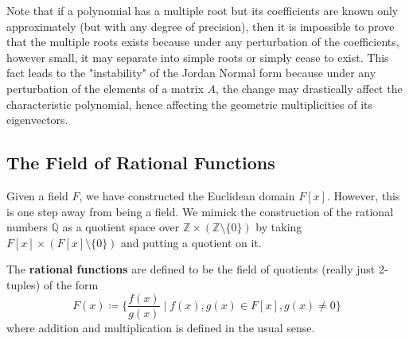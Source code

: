   Note that if a polynomial has a multiple root but its coefficients are known only approximately (but with any degree of precision), then it is impossible to prove that the multiple roots exists because under any perturbation of the coefficients, however small, it may separate into simple roots or simply cease to exist. This fact leads to the "instability" of the Jordan Normal form because under any perturbation of the elements of a matrix $A$, the change may drastically affect the characteristic polynomial, hence affecting the geometric multiplicities of its eigenvectors. 

\subsection{The Field of Rational Functions}

  Given a field $F$, we have constructed the Euclidean domain $F[x]$. However, this is one step away from being a field. We mimick the construction of the rational numbers $\mathbb{Q}$ as a quotient space over $\mathbb{Z} \times (\mathbb{Z} \setminus \{0\})$ by taking $F[x] \times (F[x] \setminus \{0\})$ and putting a quotient on it. 
  
  \begin{definition}
    The \textbf{rational functions} are defined to be the field of quotients (really just 2-tuples) of the form 
    \begin{equation}
      F(x) \coloneqq \bigg\{ \frac{f(x)}{g(x)} \; \bigg| \; f(x), g(x) \in F[x], g(x) \neq 0 \bigg\}
    \end{equation}
    where addition and multiplication is defined in the usual sense.
  \end{definition}

